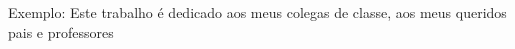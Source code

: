 \begin{dedicatoria}
\vspace*{\fill}
Exemplo: Este trabalho é dedicado aos meus colegas de classe, aos meus queridos pais e professores
\end{dedicatoria}
